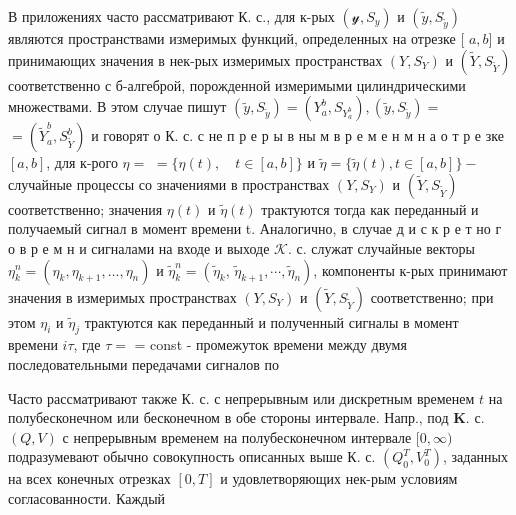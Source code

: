 \documentclass[10pt]{article}
\begin{document}
В приложениях часто рассматривают К. с., для к-рых $\left(\mathscr{y}, S_{y}\right)$ и $\left(\tilde{y}, S_{\tilde{y}}\right)$ являются пространствами измеримых функций, определенных на отрезке [ $a, b]$ и принимающих значения в нек-рых измеримых пространствах $\left(Y, S_{Y}\right)$ и $\left(\tilde{Y}, S_{\tilde{Y}}\right)$ соответственно с б-алгеброй, порожденной измеримыми цилиндрическими множествами. В этом случае пишут $\left(\tilde{y}, S_{\tilde{y}}\right)=\left(Y_{a}^{b}, S_{Y_{a}^{b}}\right),\left(\tilde{y}, S_{\tilde{y}}\right)=$ $=\left(\tilde{Y}_{a}^{b}, S_{\tilde{Y}}^{b}\right)$ и говорят о К. с. с не п р е р ы в ны м в р е м е н м н а о т р е зке $[a, b]$, для к-рого $\eta=$ $=\{\eta(t), \quad t \in[a, b]\}$ и $\tilde{\eta}=\{\tilde{\eta}(t), t \in[a, b]\}-$ случайные процессы со значениями в пространствах $\left(Y, S_{Y}\right)$ и $\left(\tilde{Y}, S_{\tilde{Y}}\right)$ соответственно; значения $\eta(t)$ и $\tilde{\eta}(t)$ трактуются тогда как переданный и получаемый сигнал в момент времени t. Аналогично, в случае д и с к р е т но г о в р е м н и сигналами на входе и выходе $\mathcal{K}$. с. служат случайные векторы $\eta_{k}^{n}=\left(\eta_{k}, \eta_{k+1}, \ldots, \eta_{n}\right)$ и $\tilde{\eta}_{k}^{n}=\left(\tilde{\eta}_{k}\right.$, $\left.\tilde{\eta}_{k+1}, \cdots, \tilde{\eta}_{n}\right)$, компоненты к-рых принимают значения в измеримых пространствах $\left(Y, S_{Y}\right)$ и $\left(\tilde{Y}, S_{\tilde{Y}}\right)$ соответственно; при этом $\eta_{i}$ и $\tilde{\eta}_{j}$ трактуются как переданный и полученный сигналы в момент времени $i \tau$, где $\tau=$ = const - промежуток времени между двумя последовательными передачами сигналов по



Часто рассматривают также К. с. с непрерывным или дискретным временем $t$ на полубесконечном или бесконечном в обе стороны интервале. Напр., под $\boldsymbol{K}$. с. $(Q, V)$ с непрерывным временем на полубесконечном интервале $[0, \infty)$ подразумевают обычно совокупность описанных выше К. с. $\left(Q_{0}^{T}, V_{0}^{T}\right)$, заданных на всех конечных отрезках $[0, T]$ и удовлетворяющих нек-рым условиям согласованности. Каждый
\end{document}

